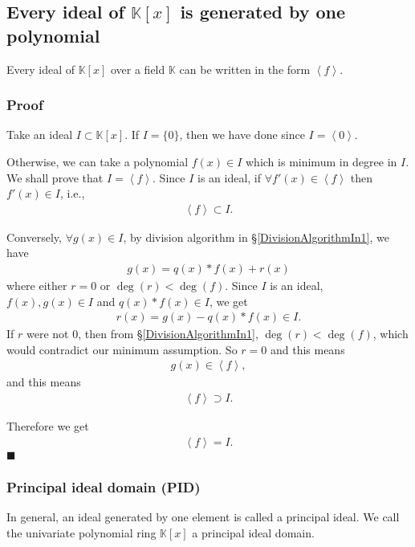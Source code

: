 \documentclass[11pt]{book}
\begin{document}
\subsection{Every ideal of $\mathbb{K}[x]$ is generated by one polynomial}
\label{InOneDimension}
Every ideal of $\mathbb{K}[x]$ over a field $\mathbb{K}$ can be written in the form $\left< f\right>$.

\subsubsection{Proof}
Take an ideal $I \subset \mathbb{K}[x]$.
If $I = \{ 0 \}$, then we have done since $I = \left< 0 \right>$.

Otherwise, we can take a polynomial $f(x) \in I$ which is minimum in degree in $I$.
We shall prove that $I = \left< f \right>$.
Since $I$ is an ideal, if $\forall f'(x) \in \left< f \right>$ then $f'(x) \in I$, i.e.,
\begin{eqnarray}
\left< f \right> \subset I.
\end{eqnarray}

Conversely, $\forall g(x) \in I$, by division algorithm in \S\ref{DivisionAlgorithmIn1}, we have
\begin{eqnarray}
g(x) = q(x)*f(x) + r(x)
\end{eqnarray}
where either $r=0$ or $\deg(r) < \deg(f)$.
Since $I$ is an ideal, $f(x),g(x) \in I$ and $q(x)*f(x) \in I$, we get
\begin{eqnarray}
r(x) = g(x) -q(x)*f(x) \in I.
\end{eqnarray}
If $r$ were not $0$, then from \S\ref{DivisionAlgorithmIn1}, $\deg(r) < \deg(f)$, which would contradict our minimum assumption.
So $r=0$ and this means
\begin{eqnarray}
g(x) \in \left< f \right>,
\end{eqnarray}
and this means
\begin{eqnarray}
\left< f \right> \supset I.
\end{eqnarray}

Therefore we get
\begin{eqnarray}
\left< f \right> = I.
\end{eqnarray}
$\blacksquare$

\subsubsection{Principal ideal domain (PID)}
In general, an ideal generated by one element is called a principal ideal.
We call the univariate polynomial ring $\mathbb{K}[x]$ a principal ideal domain.
\end{document}
